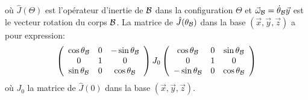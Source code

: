 où $\hat{J}(\Theta)$ est l'opérateur d'inertie de ${\cal B}$ dans
la configuration $\Theta$ et $\vec{\omega}_{\cal B} = \dot{\theta}_{\cal B}\vec{y}$ est le vecteur rotation du corps ${\cal B}$. La matrice de $\hat{J}(\theta_{\cal B})$
dans la base $(\vec{x},\vec{y},\vec{z})$ a pour expression:
$$
\left(\begin{array}{ccc}
\cos\theta_{\cal B} & 0 & -\sin\theta_{\cal B} \\
0 & 1 & 0 \\
\sin\theta_{\cal B} & 0 & \cos\theta_{\cal B}
\end{array}\right)
J_0
\left(\begin{array}{ccc}
\cos\theta_{\cal B} & 0 & \sin\theta_{\cal B} \\
0 & 1 & 0 \\
-\sin\theta_{\cal B} & 0 & \cos\theta_{\cal B}
\end{array}\right)
$$
où $J_0$ la matrice de $\hat{J}(0)$ dans la base $(\vec{x},\vec{y},\vec{z})$.

